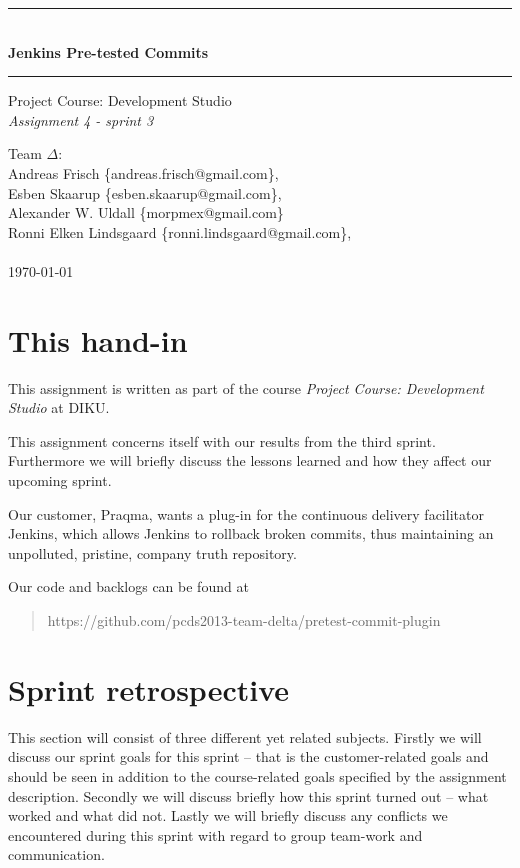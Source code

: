 \documentclass[a4paper]{article}
\makeatletter
\newcommand{\systemname}{Jenkins Pre-tested Commits}
\newcommand{\groupname}{Team $\Delta$}
\newcommand{\groupmembers}{
	Andreas Frisch \{andreas.frisch@gmail.com\}, \\
	Esben Skaarup \{esben.skaarup@gmail.com\}, \\
	Alexander W. Uldall \{morpmex@gmail.com\} \\
	Ronni Elken Lindsgaard \{ronni.lindsgaard@gmail.com\}, \\
	~
}
\makeatother
\begin{document}
\begin{titlepage}
	\begin{center}
		\vspace*{4cm}
		\rule{\linewidth}{0.5mm}\\[0.4cm]
		{\huge \bfseries \systemname}
		\rule{\linewidth}{0.5mm}
	\end{center}
	\begin{flushleft}
		{
			\Large Project Course: Development Studio \\[0.1cm]
			{\it Assignment 4 - sprint 3}
		}
	\end{flushleft}
	\vspace*{4cm}
	
	\begin{flushleft}
		{\Large \groupname :} \\[0.1cm]
		{\Large \groupmembers} \\[0.3cm]
		{\Large \today}
	\end{flushleft}
\end{titlepage}
\newpage
\onehalfspacing
\setcounter{tocdepth}{2}

\section{This hand-in}
This assignment is written as part of the course {\it Project Course: Development Studio} at DIKU.

This assignment concerns itself with our results from the third sprint.
Furthermore we will briefly discuss the lessons learned and how they affect our
upcoming sprint.

Our customer, Praqma, wants a plug-in for the continuous delivery facilitator
Jenkins, which allows Jenkins to rollback broken commits, thus maintaining an
unpolluted, pristine, company truth repository.

Our code and backlogs can be found at
\begin{quote}
	https://github.com/pcds2013-team-delta/pretest-commit-plugin
\end{quote}

\section{Sprint retrospective}
\label{sec:sprint_retrospective}
This section will consist of three different yet related subjects. Firstly we
will discuss our sprint goals for this sprint -- that is the customer-related
goals and should be seen in addition to the course-related goals specified by
the assignment description. Secondly we will discuss briefly how this sprint
turned out -- what worked and what did not. Lastly we will briefly discuss any
conflicts we encountered during this sprint with regard to group team-work and
communication.
\end{document}
